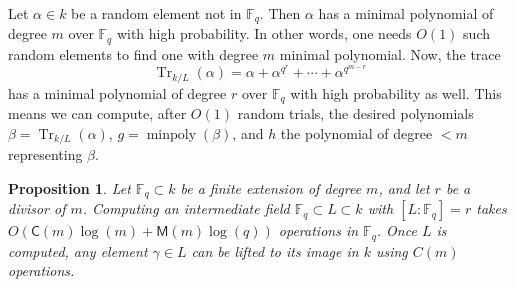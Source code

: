 \documentclass[12pt]{article}
\theoremstyle{plain}
\newtheorem{proposition}[theorem]{Proposition}
\theoremstyle{definition}
\DeclareMathOperator{\trace}{Tr} %
\DeclareMathOperator{\minpoly}{minpoly}
\def\F{\ensuremath{\mathbb{F}}}
\def\MM{\ensuremath{\mathsf{M}}}
\def\CC{\ensuremath{\mathsf{C}}}
\begin{document}
Let $\alpha\in k$ be a random element not in $\F_q$. Then $\alpha$ has a minimal polynomial of degree $m$ 
over $\F_q$ with high probability. In other words, one needs $O(1)$ such random elements to find 
one with degree $m$ minimal polynomial. Now, the trace
\begin{equation}
	\label{equ:trace-simple}
	\trace_{k/L}(\alpha) = \alpha + \alpha^{q^r} + \cdots + \alpha^{q^{m - r}}
\end{equation}
has a minimal polynomial of degree $r$ over $\F_q$ with high
probability as well. This means we can compute, after $O(1)$ random
trials, the desired polynomials $\beta = \trace_{k/L}(\alpha)$,
$g = \minpoly(\beta)$, and $h$ the polynomial of degree $<m$ representing $\beta$.

\begin{proposition}
	\label{prop:subfield}
	Let $\F_q \subset k$ be a finite extension of degree $m$, and
        let $r$ be a divisor of $m$.  Computing an intermediate field
        $\F_q \subset L \subset k$ with $[L:\F_q]=r$ takes
        $O(\CC(m)\log(m) + \MM(m)\log(q))$ operations in $\F_q$.  Once
        $L$ is computed, any element $\gamma\in L$ can be lifted to
        its image in $k$ using $C(m)$ operations.
\end{proposition}
\end{document}
